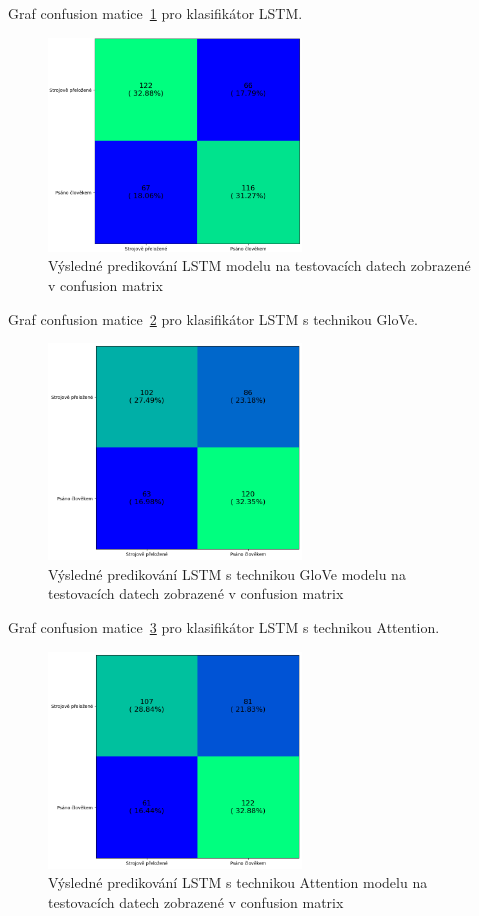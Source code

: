 Graf confusion matice~\ref{fig:EN LSTM model conf} pro klasifikátor LSTM.\@
\begin{figure}[H]
	\centering
	\includegraphics[width=0.6\textwidth]{Figures/EN_LSTM_conf.png}
	\caption{Výsledné predikování LSTM modelu na testovacích datech zobrazené v confusion matrix}\label{fig:EN LSTM model conf}
\end{figure}

Graf confusion matice~\ref{fig:EN LSTM GloVe model conf} pro klasifikátor LSTM s technikou GloVe.
\begin{figure}[H]
	\centering
	\includegraphics[width=0.6\textwidth]{Figures/EN_LSTM_GLOVE_conf.png}
	\caption{Výsledné predikování LSTM s technikou GloVe modelu na testovacích datech zobrazené v confusion matrix}\label{fig:EN LSTM GloVe model conf}
\end{figure}

Graf confusion matice~\ref{fig:EN LSTM Attention model conf} pro klasifikátor LSTM s technikou Attention.
\begin{figure}[H]
	\centering
	\includegraphics[width=0.6\textwidth]{Figures/EN_LSTM_Attention_conf.png}
	\caption{Výsledné predikování LSTM s technikou Attention modelu na testovacích datech zobrazené v confusion matrix}\label{fig:EN LSTM Attention model conf}
\end{figure}

